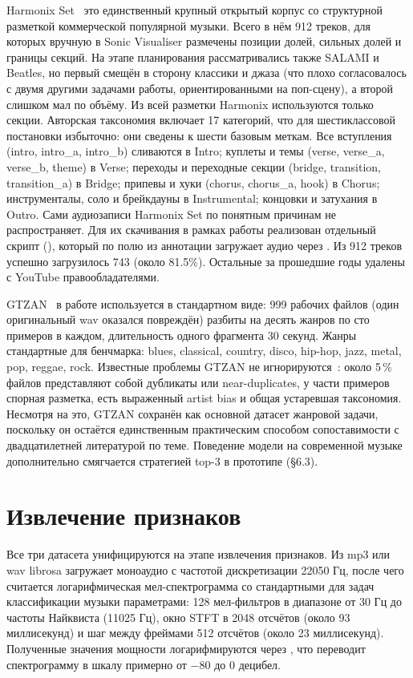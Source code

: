 Harmonix Set~\cite{nieto2019harmonix} это единственный крупный открытый корпус со структурной разметкой коммерческой популярной музыки. Всего в нём 912 треков, для которых вручную в Sonic Visualiser размечены позиции долей, сильных долей и границы секций. На этапе планирования рассматривались также SALAMI и Beatles, но первый смещён в сторону классики и джаза (что плохо согласовалось с двумя другими задачами работы, ориентированными на поп-сцену), а второй слишком мал по объёму. Из всей разметки Harmonix используются только секции. Авторская таксономия включает 17 категорий, что для шестиклассовой постановки избыточно: они сведены к шести базовым меткам. Все вступления (intro, intro\_a, intro\_b) сливаются в Intro; куплеты и темы (verse, verse\_a, verse\_b, theme) в Verse; переходы и переходные секции (bridge, transition, transition\_a) в Bridge; припевы и хуки (chorus, chorus\_a, hook) в Chorus; инструменталы, соло и брейкдауны в Instrumental; концовки и затухания в Outro. Сами аудиозаписи Harmonix Set по понятным причинам не распространяет. Для их скачивания в рамках работы реализован отдельный скрипт (), который по полю  из аннотации загружает аудио через . Из 912 треков успешно загрузилось 743 (около 81.5\%). Остальные за прошедшие годы удалены с YouTube правообладателями.

GTZAN~\cite{tzanetakis2002gtzan} в работе используется в стандартном виде: 999 рабочих файлов (один оригинальный wav оказался повреждён) разбиты на десять жанров по сто примеров в каждом, длительность одного фрагмента 30 секунд. Жанры стандартные для бенчмарка: blues, classical, country, disco, hip-hop, jazz, metal, pop, reggae, rock. Известные проблемы GTZAN не игнорируются~\cite{sturm2014state}: около 5\,\% файлов представляют собой дубликаты или near-duplicates, у части примеров спорная разметка, есть выраженный artist bias и общая устаревшая таксономия. Несмотря на это, GTZAN сохранён как основной датасет жанровой задачи, поскольку он остаётся единственным практическим способом сопоставимости с двадцатилетней литературой по теме. Поведение модели на современной музыке дополнительно смягчается стратегией top-3 в прототипе (§6.3).

\section{Извлечение признаков}\label{sec:3-2}

Все три датасета унифицируются на этапе извлечения признаков. Из mp3 или wav librosa загружает моноаудио с частотой дискретизации 22050 Гц, после чего считается логарифмическая мел-спектрограмма со стандартными для задач классификации музыки параметрами: 128 мел-фильтров в диапазоне от 30 Гц до частоты Найквиста (11025 Гц), окно STFT в 2048 отсчётов (около 93 миллисекунд) и шаг между фреймами 512 отсчётов (около 23 миллисекунд). Полученные значения мощности логарифмируются через , что переводит спектрограмму в шкалу примерно от $-80$ до $0$ децибел.

